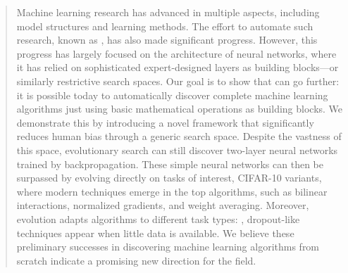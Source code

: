 \begin{abstract}
Machine learning research has advanced in multiple aspects, including model structures and learning methods. The effort to automate such research, known as \aml, has also made significant progress. However, this progress has largely focused on the architecture of neural networks, where it has relied on sophisticated expert-designed layers as building blocks---or similarly restrictive search spaces. Our goal is to show that \aml can go further: it is possible today to automatically discover complete machine learning algorithms just using basic mathematical operations as building blocks. We demonstrate this by introducing a novel framework that significantly reduces human bias through a generic search space. Despite the vastness of this space, evolutionary search can still discover two-layer neural networks trained by backpropagation. These simple neural networks can then be surpassed by evolving directly on tasks of interest, \eg CIFAR-10 variants, where modern techniques emerge in the top algorithms, such as bilinear interactions, normalized gradients, and weight averaging. Moreover, evolution adapts algorithms to different task types: \eg, dropout-like techniques appear when little data is available. We believe these preliminary successes in discovering machine learning algorithms from scratch indicate a promising new direction for the field.
\end{abstract}
